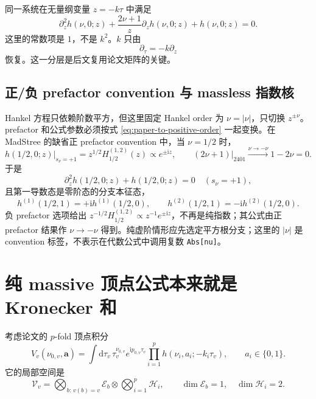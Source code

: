 \documentclass[11pt,a4paper]{ctexart}
\newcommand{\dd}{\mathrm d}
\newcommand{\ii}{\mathrm i}
\newcommand{\cV}{\mathcal V}
\newcommand{\cE}{\mathcal E}
\newcommand{\cH}{\mathcal H}
\begin{document}
同一系统在无量纲变量 $z=-k\tau$ 中满足
\begin{equation}
 \partial_z^2h(\nu,0;z)
 +\frac{2\nu+1}{z}\partial_zh(\nu,0;z)
 +h(\nu,0;z)=0.
 \label{eq:h-dimensionless-eom}
\end{equation}
这里的常数项是 $1$，不是 $k^2$。$k$ 只由
\begin{equation}
 \partial_\tau=-k\partial_z
 \label{eq:tau-z-chain}
\end{equation}
恢复。这一分层是后文复用论文矩阵的关键。

\subsection{正/负 prefactor convention 与 massless 指数核}

Hankel 方程只依赖阶数平方，但这里固定 Hankel order 为 $\nu=|\nu|$，只切换 $z^{\pm\nu}$。prefactor 和公式参数必须按式 \eqref{eq:paper-to-positive-order} 一起变换。在 MadStree 的缺省正 prefactor convention 中，当 $\nu=1/2$ 时，
\begin{equation}
 h(1/2,0;z)\big|_{s_\nu=+1}=z^{1/2}H_{1/2}^{(1,2)}(z)
 \propto e^{\pm\ii z},
 \qquad
 \left.(2\nu+1)\right|_{2401}\xrightarrow{\nu\to-\nu}1-2\nu=0.
 \label{eq:massless-h-eigenstate}
\end{equation}
于是
\begin{equation}
 \partial_z^2h(1/2,0;z)+h(1/2,0;z)=0\quad(s_\nu=+1),
 \label{eq:massless-z-eom}
\end{equation}
且第一导数态是零阶态的分支本征态，
\begin{equation}
 h^{(1)}(1/2,1)=+\ii h^{(1)}(1/2,0),
 \qquad
 h^{(2)}(1/2,1)=-\ii h^{(2)}(1/2,0).
 \label{eq:h-branch-eigenvalues}
\end{equation}
负 prefactor 选项给出 $z^{-1/2}H_{1/2}^{(1,2)}\propto z^{-1}e^{\pm\ii z}$，不再是纯指数；其公式由正 prefactor 结果作 $\nu\to-\nu$ 得到。纯虚阶情形应先选定平方根分支；这里的 $|\nu|$ 是 convention 标签，不表示在代数公式中调用复数 \texttt{Abs[nu]}。

\section{纯 massive 顶点公式本来就是 Kronecker 和}

考虑论文的 $p$-fold 顶点积分
\begin{equation}
 V_v(\nu_{0,v},\bm a)
 =\int\dd\tau_v\,
 \tau_v^{\nu_{0,v}}e^{\ii p_{0,v}\tau_v}
 \prod_{i=1}^{p}h(\nu_i,a_i;-k_i\tau_v),
 \qquad a_i\in\{0,1\}.
\end{equation}
它的局部空间是
\begin{equation}
 \cV_v
 =\bigotimes_{b:\,v(b)=v}\cE_b
 \otimes\bigotimes_{i=1}^{p}\cH_i,
 \qquad
 \dim\cE_b=1,
 \quad
 \dim\cH_i=2.
 \label{eq:vertex-tensor-space}
\end{equation}
\end{document}
